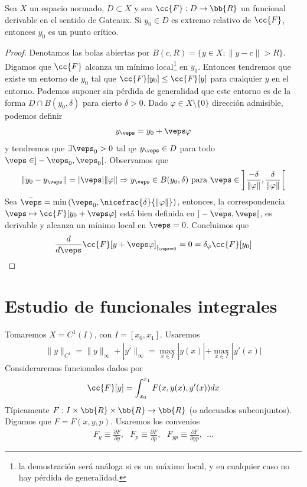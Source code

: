 \begin{prop}
    Sea $X$ un espacio normado, $D\subset X$ y sea $\cc{F}:D \to \bb{R}$ un funcional derivable en el sentido de Gateaux. Si $y_0\in D$ es extremo relativo de $\cc{F}$, entonces $y_0$ es un punto crítico.

    \begin{proof}
        Denotamos las bolas abiertas por $B(c,R)=\{y\in X : \|y-c\| > R\}$. Digamos que $\cc{F}$ alcanza un mínimo local\footnote{la demostración será análoga si es un máximo local, y en cualquier caso no hay pérdida de generalidad.} en $y_0$. Entonces tendremos que existe un entorno de $y_0$ tal que $\cc{F}[y_0] \leq \cc{F}[y]$ para cualquier $y$ en el entorno. Podemos suponer sin pérdida de generalidad que este entorno es de la forma $D\cap B(y_0, \delta)$ para cierto $\delta>0$. Dado $\varphi \in X\setminus\{0\}$ dirección admisible, podemos definir
        \begin{gather*}
            y_\veps = y_0 + \veps\varphi
        \end{gather*}
        y tendremos que $\exists \veps_0>0$ tal qe $y_\veps\in D$ para todo $\veps \in ]-\veps_0, \veps_0[$. Observamos que
        \begin{gather*}
            \|y_0 - y_\veps\| = |\veps| \|\varphi\| \Rightarrow y_\veps \in B(y_0, \delta) \text{ para } \veps \in \left] \frac{-\delta}{\|\varphi\|}, \frac{\delta}{\|\varphi\|} \right[
        \end{gather*}
        Sea $\bar{\veps} = \min\left(\veps_0, \nicefrac{\delta}{\|\varphi\|}\right)$, entonces, la correspondencia $\veps \mapsto \cc{F}[y_0+\veps\varphi]$ está bien definida en $]-\bar{\veps}, \bar{\veps}[$, es derivable y alcanza un mínimo local en $\veps=0$. Concluimos que 
        \begin{gather*}
            \frac{d}{d \veps} \cc{F}[y+\veps\varphi]_{|_{\veps=0}} = 0 = \delta_\varphi\cc{F}[y_0]
        \end{gather*}
    \end{proof}
\end{prop}

\section{Estudio de funcionales integrales}

Tomaremos $X=C^1(I)$, con $I=[x_0, x_1]$. Usaremos
\begin{gather*}
    \|y\|_{C^1} = \|y\|_\infty + |y'\|_\infty = \max_{x\in I}|y(x)| + \max_{x\in I}|y'(x)|
\end{gather*}
Consideraremos funcionales dados por 
\begin{gather*}
    \cc{F}[y] = \int_{x_0}^{x_1} F(x, y(x), y'(x)) dx
\end{gather*}
Típicamente $F:I \times \bb{R} \times \bb{R} \to \bb{R}$ (o adecuados subconjuntos). Digamos que $F=F(x,y,p)$.
Usaremos los convenios
\begin{gather*}
    F_y \equiv \frac{\partial F}{\partial y},\ \ \ F_p \equiv \frac{\partial F}{\partial p},\ \ \ F_{yp} \equiv \frac{\partial F}{\partial yp},\ \ ... 
\end{gather*}

